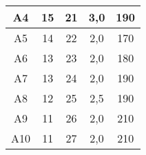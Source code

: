 \begin{table}[]
\begin{tabular}{@{}ccccc@{}}
		A4   & 15                                                                                      & 21                                                                                    & 3,0                                                                         & 190                                                                   \\ \midrule
		A5   & 14                                                                                      & 22                                                                                    & 2,0                                                                         & 170                                                                   \\ \midrule
		A6   & 13                                                                                      & 23                                                                                    & 2,0                                                                         & 180                                                                   \\ \midrule
		A7   & 13                                                                                      & 24                                                                                    & 2,0                                                                         & 190                                                                   \\ \midrule
		A8   & 12                                                                                      & 25                                                                                    & 2,5                                                                         & 190                                                                   \\ \midrule
		A9   & 11                                                                                      & 26                                                                                    & 2,0                                                                         & 210                                                                   \\ \midrule
		A10  & 11                                                                                      & 27                                                                                    & 2,0                                                                         & 210                                                                   \\ \bottomrule
	\end{tabular}
	\label{tab:hslm_a_parameters}
\end{table}

